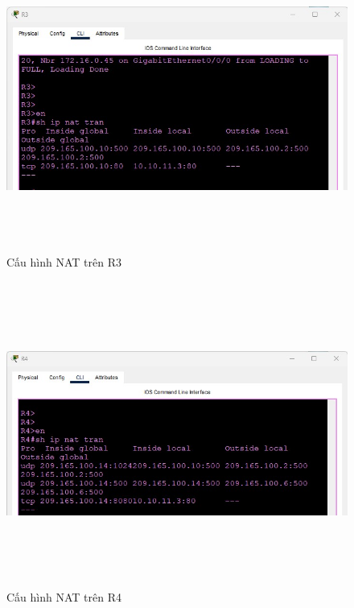 \documentclass[a4paper, 12pt]{article}
\begin{document}
\begin{figure}[H]
    \centering
    \includegraphics[width=16cm, height=10cm]{img/nat3.jpg}
    \caption{Cấu hình NAT trên R3}
    \label{nat3}
\end{figure}
\begin{figure}[H]
    \centering
    \includegraphics[width=16cm, height=10cm]{img/nat4.jpg}
    \caption{Cấu hình NAT trên R4}
    \label{nat4}
\end{figure}
\end{document}
